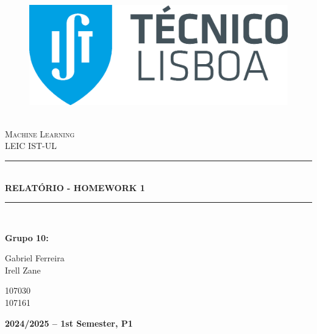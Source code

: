 \documentclass{article}
\newcommand{\HRule}[1]{\rule{\linewidth}{#1}}
\begin{document}
\begin{center}
  \begin{figure}
    \includegraphics[scale = 0.3, left]{img/IST_A.eps} %
    \end{figure}
  \LARGE{ \normalsize \textsc{} \\
  [2.0cm] 
  \LARGE{ \LARGE \textsc{Machine Learning}} \\
  [1cm]
  \LARGE{ \LARGE \textsc{LEIC IST-UL}} \\
  [1cm]
  \HRule{1.5pt} \\
  [0.4cm]
  \LARGE \textbf{\uppercase{Relatório - Homework 1}}
  \HRule{1.5pt}
  \\ [2.5cm]
  }
\end{center}

\begin{flushleft}
  \textbf{\LARGE Grupo 10:}
\end{flushleft}

\begin{center}
  \begin{minipage}{0.7\textwidth}
      \begin{flushleft}
        \large Gabriel Ferreira \\
        \large  Irell Zane
      \end{flushleft}
  \end{minipage}%
  \begin{minipage}{0.3\textwidth}
      \begin{flushright}
        \large 107030\\
        \large 107161
      \end{flushright}
  \end{minipage}
\end{center}

\begin{center}
  \vspace{4cm}
  \date \large \bf  2024/2025 -- 1st Semester, P1
\end{center}
\end{document}
